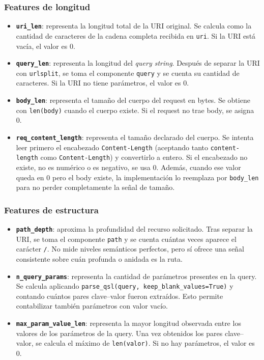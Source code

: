 \documentclass[12pt,oneside]{report}
\begin{document}
\subsubsection{Features de longitud}
\begin{itemize}[leftmargin=*]
  \item \textbf{\texttt{uri\_len}}: representa la longitud total de la URI original. Se calcula como la cantidad de caracteres de la cadena completa recibida en \texttt{uri}. Si la URI está vacía, el valor es 0.

  \item \textbf{\texttt{query\_len}}: representa la longitud del \textit{query string}. Después de separar la URI con \texttt{urlsplit}, se toma el componente \texttt{query} y se cuenta su cantidad de caracteres. Si la URI no tiene parámetros, el valor es 0.

  \item \textbf{\texttt{body\_len}}: representa el tamaño del cuerpo del request en bytes. Se obtiene con \texttt{len(body)} cuando el cuerpo existe. Si el request no trae body, se asigna 0.

  \item \textbf{\texttt{req\_content\_length}}: representa el tamaño declarado del cuerpo. Se intenta leer primero el encabezado \texttt{Content-Length} (aceptando tanto \texttt{content-length} como \texttt{Content-Length}) y convertirlo a entero. Si el encabezado no existe, no es numérico o es negativo, se usa 0. Además, cuando ese valor queda en 0 pero el body existe, la implementación lo reemplaza por \texttt{body\_len} para no perder completamente la señal de tamaño.
\end{itemize}

\subsubsection{Features de estructura}
\begin{itemize}[leftmargin=*]
  \item \textbf{\texttt{path\_depth}}: aproxima la profundidad del recurso solicitado. Tras separar la URI, se toma el componente \texttt{path} y se cuenta cuántas veces aparece el carácter \texttt{/}. No mide niveles semánticos perfectos, pero sí ofrece una señal consistente sobre cuán profunda o anidada es la ruta.

  \item \textbf{\texttt{n\_query\_params}}: representa la cantidad de parámetros presentes en la query. Se calcula aplicando \texttt{parse\_qsl(query, keep\_blank\_values=True)} y contando cuántos pares clave--valor fueron extraídos. Esto permite contabilizar también parámetros con valor vacío.

  \item \textbf{\texttt{max\_param\_value\_len}}: representa la mayor longitud observada entre los valores de los parámetros de la query. Una vez obtenidos los pares clave--valor, se calcula el máximo de \texttt{len(valor)}. Si no hay parámetros, el valor es 0.
\end{itemize}
\end{document}
